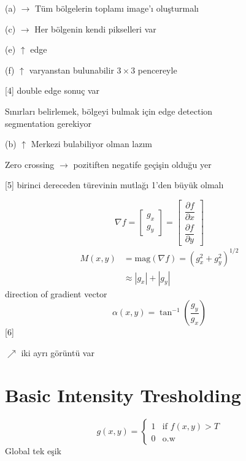 \documentclass[11pt,a4paper]{article}
\begin{document}
(a) $\rightarrow$ Tüm bölgelerin toplamı image'ı oluşturmalı

(c) $\rightarrow$ Her bölgenin kendi pikselleri var

(e) $\uparrow$  edge

(f) $\uparrow$ varyanstan bulunabilir $3\times3$ pencereyle

[4]
double edge sonuç var

\noindent Sınırları belirlemek, bölgeyi bulmak için edge detection\\
\hspace*{2em}segmentation \hfill gerekiyor

(b) $\uparrow$ Merkezi bulabiliyor olman lazım


Zero crossing $\rightarrow$ pozitiften negatife geçişin olduğu yer

[5]
birinci dereceden türevinin mutlağı 1'den büyük olmalı

\[
\nabla f=\begin{bmatrix} g_x\\ g_y\end{bmatrix}=\begin{bmatrix}\dfrac{\partial f}{\partial x}\\[6pt] \dfrac{\partial f}{\partial y}\end{bmatrix}
\]
\begin{align*}
M(x,y) &= \mathrm{mag}(\nabla f)=\left(g_x^{2}+g_y^{2}\right)^{1/2}\\
&\approx |g_x|+|g_y|
\end{align*}
direction of gradient vector
\[ \alpha(x,y)=\tan^{-1}\!\left(\frac{g_y}{g_x}\right) \]
[6]

$\nearrow$ iki ayrı görüntü var 

\section{Basic Intensity Tresholding}
\[
g(x,y)=\begin{cases}1 & \text{if } f(x,y)>T\\ 0 & \text{o.w}\end{cases}
\]
Global tek eşik
\end{document}
